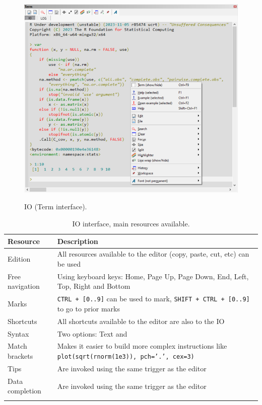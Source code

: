 \begin{figure}[H]
  \includegraphics[scale=0.35]{./res/term_io.png}\\
  \caption{IO (Term interface).}
  \label{fig:term_io}
\end{figure}

\begin{table}
  \begin{footnotesize}
    \begin{tabularx}{\textwidth}{>{\hsize=0.3\hsize}X>{\hsize=0.7\hsize}X}\\
      \hline
      \textbf{Resource} & \textbf{Description} \\
      \hline
      Edition & All resources available to the editor (copy, paste, cut, etc) can be used \\
      Free navigation & Using keyboard keys: Home, Page Up, Page Down, End, Left, Top, Right and Bottom \\
      Marks & \texttt{CTRL + [0..9]} can be used to mark, \texttt{SHIFT + CTRL + [0..9]} to go to prior marks \\
      Shortcuts & All shortcuts available to the editor are also to the IO \\
      Syntax & Two options: Text and \RR{} \\
      Match brackets & Makes it easier to build more complex instructions like \texttt{plot(sqrt(rnorm(1e3)), pch='.', cex=3)} \\
      Tips & Are invoked using the same trigger as the editor \\
      Data completion & Are invoked using the same trigger as the editor \\
      \hline
      \\
    \end{tabularx}
  \end{footnotesize}
  \caption{IO interface, main resources available.}
  \label{tab:io_interface}
\end{table}

